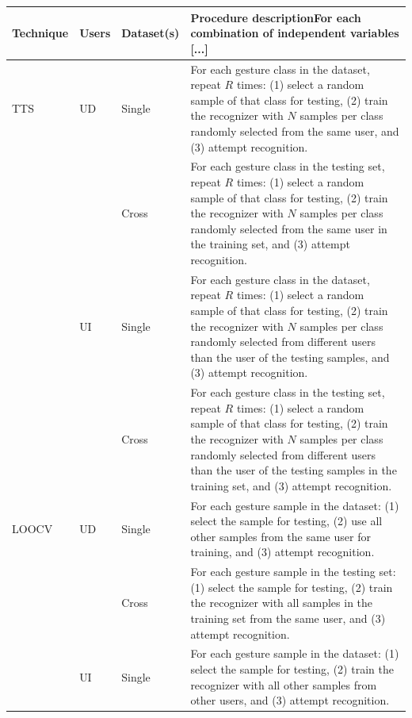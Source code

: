 \begin{table}
  \footnotesize
  \centering
  \begin{tabular}{lllp{6.9cm}}
      \toprule
      \textbf{Technique} & \textbf{Users} & \textbf{Dataset(s)} & \textbf{Procedure description}\newline For each combination of independent variables [...] \\
      \midrule
      TTS     & UD    & Single & For each gesture class in the dataset, repeat $R$ times: (1) select a random sample of that class for testing, (2) train the recognizer with $N$ samples per class randomly selected from the same user, and (3) attempt recognition.\\
                      \cmidrule{3-4}
              &       & Cross  & For each gesture class in the testing set, repeat $R$ times: (1) select a random sample of that class for testing, (2) train the recognizer with $N$ samples per class randomly selected from the same user in the training set, and (3) attempt recognition. \\
              \cmidrule{2-4}
              & UI    & Single & For each gesture class in the dataset, repeat $R$ times: (1) select a random sample of that class for testing, (2) train the recognizer with $N$ samples per class randomly selected from different users than the user of the testing samples, and (3) attempt recognition.\\
                      \cmidrule{3-4}
              &       & Cross  & For each gesture class in the testing set, repeat $R$ times: (1) select a random sample of that class for testing, (2) train the recognizer with $N$ samples per class randomly selected from different users than the user of the testing samples in the training set, and (3) attempt recognition.\\
      \midrule
      LOOCV   & UD    & Single & For each gesture sample in the dataset: (1) select the sample for testing, (2) use all other samples from the same user for training, and (3) attempt recognition. \\
                      \cmidrule{3-4}
              &       & Cross  & For each gesture sample in the testing set: (1) select the sample for testing, (2) train the recognizer with all samples in the training set from the same user, and (3) attempt recognition.\\
              \cmidrule{2-4}
              & UI    & Single & For each gesture sample in the dataset: (1) select the sample for testing, (2) train the recognizer with all other samples from other users, and (3) attempt recognition. \\

\end{tabular}
\end{table}

